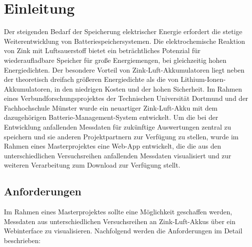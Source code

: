 \chapter{Einleitung}\label{ch:einleitung}


Der steigenden Bedarf der Speicherung elektrischer Energie erfordert die stetige Weiterentwicklung von Batteriespeichersystemen. Die elektrochemische Reaktion von Zink mit Luftsauerstoff bietet ein beträchtliches Potenzial für wiederaufladbare Speicher für große Energiemengen, bei gleichzeitig hohen Energiedichten. Der besondere Vorteil von Zink-Luft-Akkumulatoren liegt neben der theoretisch dreifach größeren Energiedichte als die von Lithium-Ionen-Akkumulatoren, in den niedrigen Kosten und der hohen Sicherheit. Im Rahmen eines Verbundforschungsprojektes der Technischen Universität Dortmund und der Fachhochschule Münster wurde ein neuartiger Zink-Luft-Akku mit dem dazugehörigen Batterie-Management-System entwickelt. Um die bei der Entwicklung anfallenden Messdaten für zukünftige Auswertungen zentral zu speichern und sie anderen Projektpartnern zur Verfügung zu stellen, wurde im Rahmen eines Masterprojektes eine Web-App entwickelt, die die aus den unterschiedlichen Versuchsreihen anfallenden Messdaten visualisiert und zur weiteren Verarbeitung zum Download zur Verfügung stellt.

\section{Anforderungen}

Im Rahmen eines Masterprojektes sollte eine Möglichkeit geschaffen werden, Messdaten aus unterschiedlichen Versuchsreihen an Zink-Luft-Akkus über ein Webinterface zu visualisieren. Nachfolgend werden die Anforderungen im Detail beschrieben:

